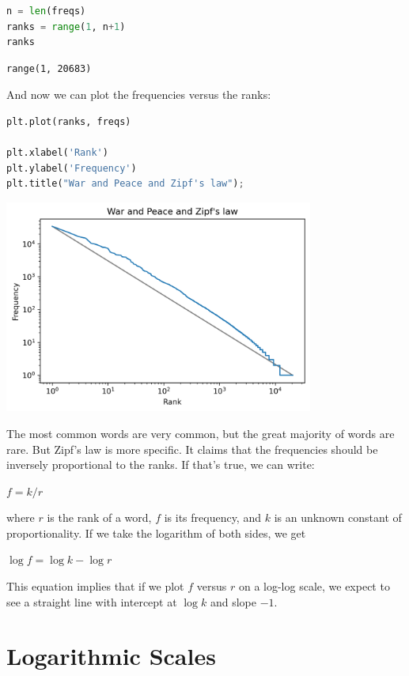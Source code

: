 \begin{lstlisting}[language=Python,style=source]
n = len(freqs)
ranks = range(1, n+1)
ranks
\end{lstlisting}

\begin{lstlisting}[style=output]
range(1, 20683)
\end{lstlisting}

And now we can plot the frequencies versus the ranks:

\begin{lstlisting}[language=Python,style=source]
plt.plot(ranks, freqs)

plt.xlabel('Rank')
plt.ylabel('Frequency')
plt.title("War and Peace and Zipf's law");
\end{lstlisting}

\begin{center}
\includegraphics[width=4in]{chapters/06_plotting_files/06_plotting_84_0.png}
\end{center}

The most common words are very common, but the great majority of words
are rare. But Zipf's law is more specific. It claims that the
frequencies should be inversely proportional to the ranks. If that's
true, we can write:

\(f = k / r\)

where \(r\) is the rank of a word, \(f\) is its frequency, and \(k\) is
an unknown constant of proportionality. If we take the logarithm of both
sides, we get

\(\log f = \log k - \log r\)

This equation implies that if we plot \(f\) versus \(r\) on a log-log
scale, we expect to see a straight line with intercept at \(\log k\) and
slope \(-1\).

\hypertarget{logarithmic-scales}{%
\section{Logarithmic Scales}\label{logarithmic-scales}}

